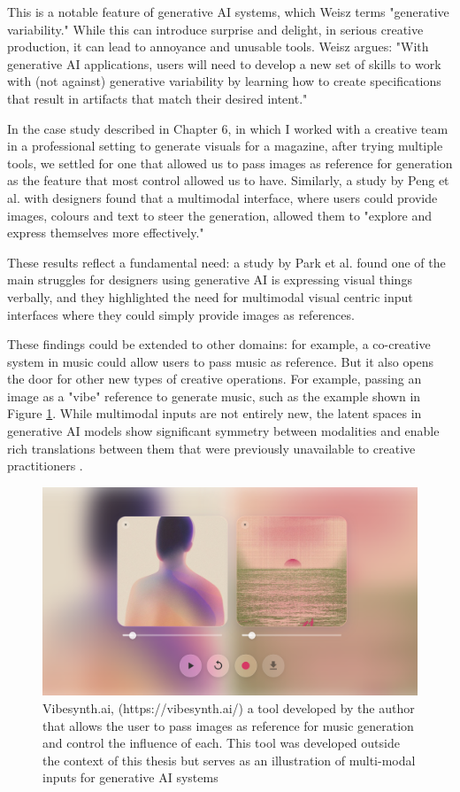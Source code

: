 This is a notable feature of generative AI systems, which Weisz \cite{Weisz2024-io} terms "generative variability." While this can introduce surprise and delight, in serious creative production, it can lead to annoyance and unusable tools. Weisz argues: "With generative AI applications, users will need to develop a new set of skills to work with (not against) generative variability by learning how to create specifications that result in artifacts that match their desired intent." 

In the case study described in Chapter 6, in which I worked with a creative team in a professional setting to generate visuals for a magazine, after trying multiple tools, we settled for one that allowed us to pass images as reference for generation as the feature that most control allowed us to have. Similarly, a study by Peng et al. \cite{Peng2024-tr} with designers found that a multimodal interface, where users could provide images, colours and text to steer the generation, allowed them to "explore and express themselves more effectively." 

These results reflect a fundamental need: a study by Park et al. \cite{Park2024-gw} found one of the main struggles for designers using generative AI is expressing visual things verbally, and they highlighted the need for multimodal visual centric input interfaces where they could simply provide images as references. 

These findings could be extended to other domains: for example, a co-creative system in music could allow users to pass music as reference. But it also opens the door for other new types of creative operations. For example, passing an image as a "vibe" reference to generate music, such as the example shown in Figure \ref{fig:vibesynth}. While multimodal inputs are not entirely new, the latent spaces in generative AI models show significant symmetry between modalities and enable rich translations between them that were previously unavailable to creative practitioners \cite{Radford2021-hb}.  


\begin{figure}[H]
    \centering
    \includegraphics[width=.75\linewidth]{vibesynth.png}
    \caption{Vibesynth.ai, (https://vibesynth.ai/) a tool developed by the author that allows the user to pass images as reference for music generation and control the influence of each. This tool was developed outside the context of this thesis but serves as an illustration of multi-modal inputs for generative AI systems}
    \label{fig:vibesynth}
\end{figure}



